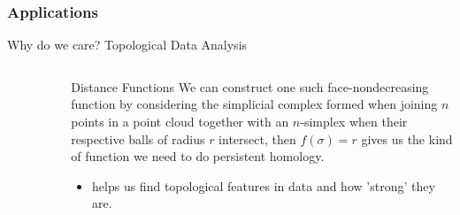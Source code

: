 \documentclass{beamer}
\theoremstyle{definition}
\numberwithin{theorem}{section}
\begin{document}
\begin{frame}
\frametitle{Applications}
\begin{block}{Why do we care? Topological Data Analysis}

\end{block}
\begin{columns}[t]
	\begin{column}{0.4\textwidth}
	\begin{figure}
	\includegraphics[width = 4cm]{barcode-crop.png}
		
		\end{figure}
		\begin{figure}
	\includegraphics[width = 4cm]{persist.jpg}
		\tiny
		\end{figure}
	\end{column}
	\begin{column}{0.4\textwidth}
	\begin{block}{Distance Functions}
	\scriptsize
		We can construct one such face-nondecreasing function by considering the simplicial complex formed when joining $n$ points in a point cloud together with an $n$-simplex when their respective balls of radius $r$ intersect, then $f(\sigma) = r$  gives us the kind of function we need to do persistent homology. 
		\begin{itemize}
			\item{helps us find topological features in data and how 'strong' they are.}
		\end{itemize}
	\end{block}
	\end{column}
\end{columns}
\end{frame}
\end{document}
